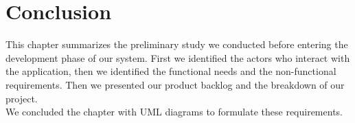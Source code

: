 \section*{Conclusion}
This chapter summarizes the preliminary study we conducted before entering the development phase of our system. First we identified the actors who interact with the application, then we identified the functional needs and the non-functional requirements. Then we presented our product backlog and the breakdown of our project.\\
We concluded the chapter with UML diagrams to formulate these requirements.

    